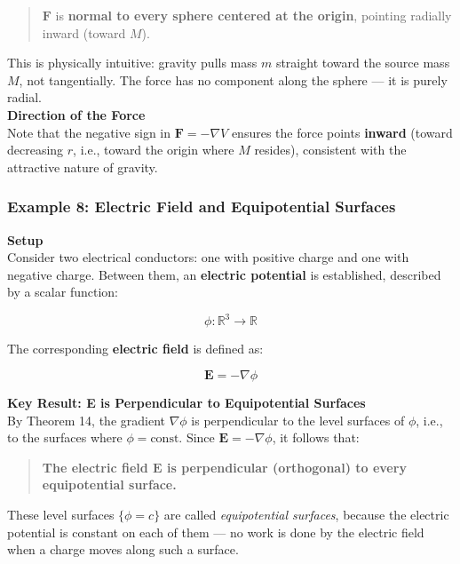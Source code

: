 \begin{respuesta}
\begin{quote}
    $\mathbf{F}$ is \textbf{normal to every sphere centered at the origin}, pointing radially inward (toward $M$).
\end{quote}

This is physically intuitive: gravity pulls mass $m$ straight toward the source mass $M$, not tangentially. The force has no component along the sphere --- it is purely radial.\\

\textbf{Direction of the Force}\\

Note that the negative sign in $\mathbf{F} = -\nabla V$ ensures the force points \textbf{inward} (toward decreasing $r$, i.e., toward the origin where $M$ resides), consistent with the attractive nature of gravity.

\subsubsection*{Example 8: Electric Field and Equipotential Surfaces}

\textbf{Setup}\\

 Consider two electrical conductors: one with positive charge and one with negative charge. Between them, an \textbf{electric potential} is established, described by a scalar function:

\[
\phi: \mathbb{R}^3 \to \mathbb{R}
\]

The corresponding \textbf{electric field} is defined as:

\[
\mathbf{E} = -\nabla\phi
\]

\textbf{Key Result: E is Perpendicular to Equipotential Surfaces}\\

By Theorem 14, the gradient $\nabla\phi$ is perpendicular to the level surfaces of $\phi$, i.e., to the surfaces where $\phi = \text{const}$. Since $\mathbf{E} = -\nabla\phi$, it follows that:

\begin{quote}
    \textbf{The electric field $\mathbf{E}$ is perpendicular (orthogonal) to every equipotential surface.}
\end{quote}

These level surfaces $\{\phi = c\}$ are called \textit{equipotential surfaces}, because the electric potential is constant on each of them --- no work is done by the electric field when a charge moves along such a surface.\\


\end{respuesta}
